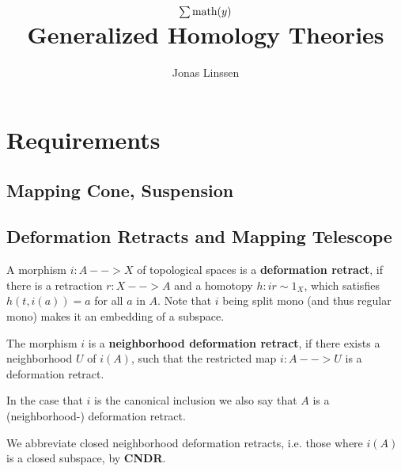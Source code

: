 

\title{$\sum\text{math}(y)$\\Generalized Homology Theories}
\author{Jonas Linssen}


	\maketitle
	\tableofcontents

	\newpage
	\setcounter{section}{-1}
	\section{Requirements}
	\subsection{Mapping Cone, Suspension}
	\subsection{Deformation Retracts and Mapping Telescope}

	\begin{definition}
		A morphism $i:A --> X$ of topological spaces is a \textbf{deformation retract}, if there is a retraction $r:X --> A$ and a homotopy $h:ir \sim 1_X$, which satisfies $h(t,i(a)) = a$ for all $a$ in $A$. Note that $i$ being split mono (and thus regular mono) makes it an embedding of a subspace.

		The morphism $i$ is a \textbf{neighborhood deformation retract}, if there exists a neighborhood $U$ of $i(A)$, such that the restricted map $i:A-->U$ is a deformation retract.

		In the case that $i$ is the canonical inclusion we also say that $A$ is a (neighborhood-) deformation retract.

		We abbreviate closed neighborhood deformation retracts, i.e. those where $i(A)$ is a closed subspace, by \textbf{CNDR}.
	\end{definition}

